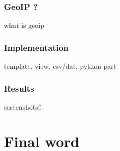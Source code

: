 \documentclass{koala-en}
\begin{document}
\subsection{GeoIP ?}
what is geoip
\subsection{Implementation}
template, view, csv/dat, python part
\subsection{Results}
screenshots!!

\chapter{Final word}

\thispagestyle{fancy}
\newpage


\printglossary[style=altlisthypergroup]

\thispagestyle{fancy}
\end{document}
